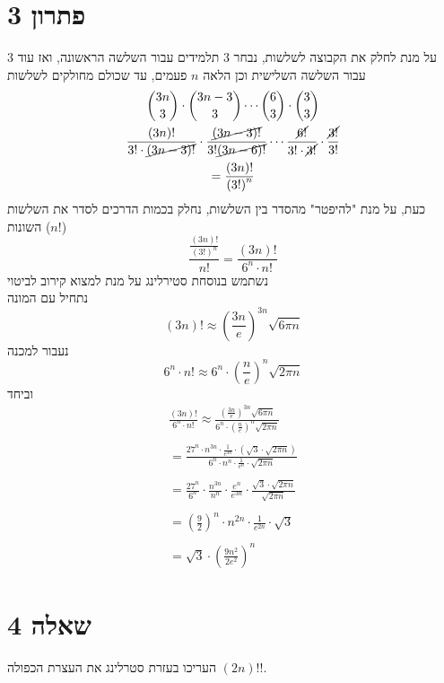 \documentclass[12pt, titlepage]{article}
\begin{document}
\part*{פתרון 3}
על מנת לחלק את הקבוצה לשלשות, נבחר $3$ תלמידים עבור השלשה הראשונה, ואז עוד $3$ עבור השלשה השלישית וכן הלאה $n$ פעמים, עד שכולם מחולקים לשלשות
\begin{gather*}
    \binom{3n}{3} \cdot \binom{3n-3}{3} \cdots \binom{6}{3}\cdot \binom{3}{3}\\
    \frac{\left(3n\right)!}{3!\cdot\cancel{\left(3n-3\right)!}}\cdot \frac{\cancel{\left(3n-3\right)!}}{3!\cancel{\left(3n-6\right)!}}\cdots \frac{\cancel{6!}}{3!\cdot\cancel{3!}}\cdot\frac{\cancel{3!}}{3!} \\
    = \frac{\left(3n\right)!}{\left(3!\right)^n}
\end{gather*}
כעת, על מנת "להיפטר" מהסדר בין השלשות, נחלק בכמות הדרכים לסדר את השלשות השונות ($n!$)
\[
    \frac{\frac{\left(3n\right)!}{\left(3!\right)^n}}{n!}= \frac{\left(3n\right)!}{6^n\cdot n!}
\]
נשתמש בנוסחת סטירלינג על מנת למצוא קירוב לביטוי\\
נתחיל עם המונה
\[
    \left(3n\right)! \approx \left(\frac{3n}{e}\right)^{3n} \sqrt{6\pi n} 
\]
נעבור למכנה
\[
    6^n \cdot n! \approx  6^n \cdot \left(\frac{n}{e}\right)^n \sqrt{2\pi n} 
\]
וביחד
\begin{gather*}
    \frac{\left(3n\right)!}{6^n\cdot n!} \approx  \frac{\left(\frac{3n}{e}\right)^{3n} \sqrt{6\pi n}}{6^n \cdot \left(\frac{n}{e}\right)^n \sqrt{2\pi n} }\\ \\
= \frac{27^{n}\cdot n^{3n} \cdot \frac{1}{e^{3n}} \cdot \left(\sqrt{3}\cdot\sqrt{2\pi n}\right)}{6^n \cdot n^n \cdot \frac{1}{e^n} \cdot \sqrt{2\pi n}} \\ \\
=    \frac{27^n}{6^n} \cdot \frac{n^{3n}}{n^n} \cdot \frac{e^{n}}{e^{3n}} \cdot \frac{\sqrt{3}\cdot \sqrt{2\pi n}}{\sqrt{2\pi n}} \\ \\
= \left(\frac{9}{2}\right)^n \cdot n^{2n} \cdot \frac{1}{e^{2n}} \cdot \sqrt{3} \\\\
= \sqrt{3} \cdot \left(\frac{9n^2}{2e^2}\right)^{n}
\end{gather*}
\newpage
\part*{שאלה 4}
העריכו בעזרת סטרלינג את העצרת הכפולה $\left(2n\right)!!$.
\end{document}
